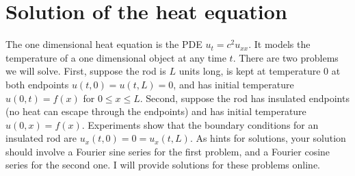\section{Solution of the heat equation}
The one dimensional heat equation is the PDE $u_t = c^2 u_{xx}$.  It models the temperature of a one dimensional object at any time $t$.  There are two problems we will solve.  First, suppose the rod is $L$ units long, is kept at temperature 0 at both endpoints $u(t,0)=u(t,L)=0$, and has initial temperature $u(0,t)=f(x)$ for $0\leq x\leq L$. Second, suppose the rod has insulated endpoints (no heat can escape through the endpoints) and has initial temperature $u(0,x)=f(x)$.  Experiments show that the boundary conditions for an insulated rod are $u_x(t,0)=0=u_x(t,L)$.  As hints for solutions, your solution should involve a Fourier sine series for the first problem, and a Fourier cosine series for the second one.  I will provide solutions for these problems online.   

